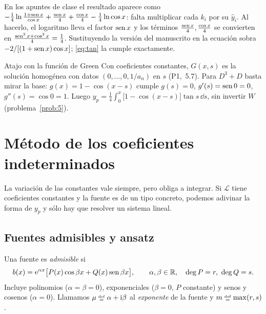 \documentclass[11pt,twoside]{article}
\newcommand\Lop{\mathcal L}
\newcommand\yh{\hat y}
\newcommand\D{D}
\newcommand\pI[1]{(P1,~#1)}
\begin{document}
\begin{observacion}
En los apuntes de clase el resultado aparece como $-\frac14\ln\frac{1+\operatorname{sen} x}{\cos x}+\frac{\operatorname{sen} x}4+\frac{\cos x}4-\frac14\ln\cos x$:
falta multiplicar cada $k_i$ por su $\yh_i$. Al hacerlo, el logaritmo lleva el factor $\operatorname{sen} x$ y los términos
$\frac{\operatorname{sen} x}4,\frac{\cos x}4$ se convierten en $\frac{\operatorname{sen}^2x+\cos^2x}{4}=\frac14$. Sustituyendo la versión del
manuscrito en la ecuación sobra $-2/[(1+\operatorname{sen} x)\cos x]$; \eqref{eq:tan} la cumple exactamente.
\end{observacion}

\begin{consejo}{Atajo con la función de Green}
Con coeficientes constantes, $G(x,s)$ es la solución homogénea con datos $(0,\dots,0,1/a_n)$ en $s$ \pI{5.7}. Para
$\D^3+\D$ basta mirar la base: $g(x)=1-\cos(x-s)$ cumple $g(s)=0$, $g'(s)=\operatorname{sen}0=0$, $g''(s)=\cos0=1$. Luego
$y_p=\frac14\int_0^x\big[1-\cos(x-s)\big]\tan s\,\dd s$, sin invertir $W$ (problema~\ref{prob:5}).
\end{consejo}

\section{Método de los coeficientes indeterminados}\label{sec:coefind}

La variación de las constantes vale siempre, pero obliga a integrar. Si $\Lop$ tiene coeficientes constantes y la
fuente es de un tipo concreto, podemos adivinar la forma de $y_p$ y sólo hay que resolver un sistema lineal.

\subsection{Fuentes admisibles y ansatz}

\begin{definicion}\label{def:fuente}
Una fuente es \emph{admisible} si
\begin{equation}\label{eq:fuente}
b(x)=\mathrm{e}^{\alpha x}\big[P(x)\cos\beta x+Q(x)\operatorname{sen}\beta x\big],\qquad \alpha,\beta\in\mathbb{R},\quad \deg P=r,\ \deg Q=s .
\end{equation}
Incluye polinomios ($\alpha=\beta=0$), exponenciales ($\beta=0$, $P$ constante) y senos y cosenos ($\alpha=0$).
Llamamos $\mu\defeq\alpha+\iu\beta$ al \emph{exponente} de la fuente y $m\defeq\max(r,s)$.
\end{definicion}
\end{document}

